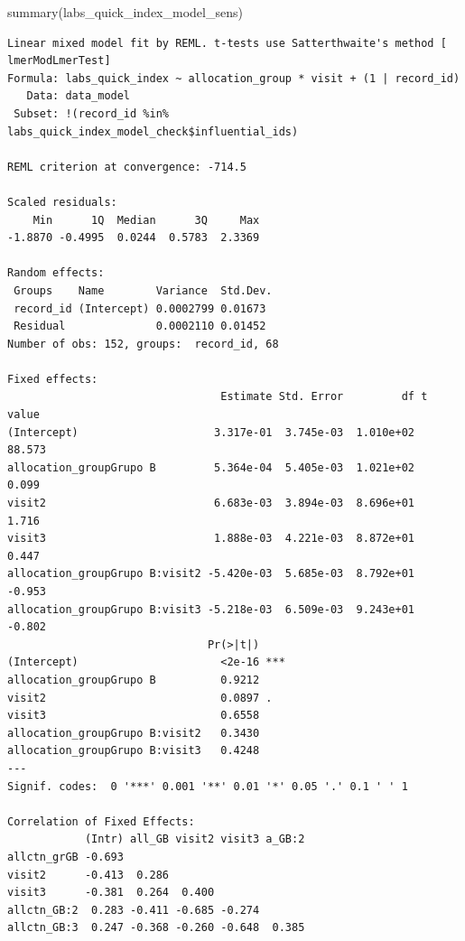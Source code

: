 \documentclass[
  letterpaper,
  DIV=11,
  numbers=noendperiod]{scrartcl}
\newenvironment{Shaded}{\begin{snugshade}}{\end{snugshade}}
\newcommand{\FunctionTok}[1]{\textcolor[rgb]{0.28,0.35,0.67}{#1}}
\newcommand{\NormalTok}[1]{\textcolor[rgb]{0.00,0.23,0.31}{#1}}
\newcommand{\SpecialCharTok}[1]{\textcolor[rgb]{0.37,0.37,0.37}{#1}}
\begin{document}
\begin{Shaded}
\begin{Highlighting}[]
\FunctionTok{summary}\NormalTok{(labs\_quick\_index\_model\_sens)}
\end{Highlighting}
\end{Shaded}

\begin{verbatim}
Linear mixed model fit by REML. t-tests use Satterthwaite's method [
lmerModLmerTest]
Formula: labs_quick_index ~ allocation_group * visit + (1 | record_id)
   Data: data_model
 Subset: !(record_id %in% labs_quick_index_model_check$influential_ids)

REML criterion at convergence: -714.5

Scaled residuals: 
    Min      1Q  Median      3Q     Max 
-1.8870 -0.4995  0.0244  0.5783  2.3369 

Random effects:
 Groups    Name        Variance  Std.Dev.
 record_id (Intercept) 0.0002799 0.01673 
 Residual              0.0002110 0.01452 
Number of obs: 152, groups:  record_id, 68

Fixed effects:
                                 Estimate Std. Error         df t value
(Intercept)                     3.317e-01  3.745e-03  1.010e+02  88.573
allocation_groupGrupo B         5.364e-04  5.405e-03  1.021e+02   0.099
visit2                          6.683e-03  3.894e-03  8.696e+01   1.716
visit3                          1.888e-03  4.221e-03  8.872e+01   0.447
allocation_groupGrupo B:visit2 -5.420e-03  5.685e-03  8.792e+01  -0.953
allocation_groupGrupo B:visit3 -5.218e-03  6.509e-03  9.243e+01  -0.802
                               Pr(>|t|)    
(Intercept)                      <2e-16 ***
allocation_groupGrupo B          0.9212    
visit2                           0.0897 .  
visit3                           0.6558    
allocation_groupGrupo B:visit2   0.3430    
allocation_groupGrupo B:visit3   0.4248    
---
Signif. codes:  0 '***' 0.001 '**' 0.01 '*' 0.05 '.' 0.1 ' ' 1

Correlation of Fixed Effects:
            (Intr) all_GB visit2 visit3 a_GB:2
allctn_grGB -0.693                            
visit2      -0.413  0.286                     
visit3      -0.381  0.264  0.400              
allctn_GB:2  0.283 -0.411 -0.685 -0.274       
allctn_GB:3  0.247 -0.368 -0.260 -0.648  0.385
\end{verbatim}

\begin{Shaded}
\end{Shaded}
\end{document}
